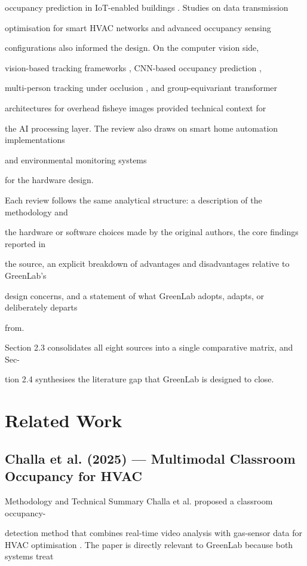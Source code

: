 occupancy prediction in IoT-enabled buildings \cite{khan2024}. Studies on data transmission

optimisation for smart HVAC networks \cite{alturjman2024} and advanced occupancy sensing

conﬁgurations \cite{tanaka2024} also informed the design. On the computer vision side,

vision-based tracking frameworks \cite{zhou2021}, CNN-based occupancy prediction \cite{meng2023},

multi-person tracking under occlusion \cite{kumar2024}, and group-equivariant transformer

architectures for overhead ﬁsheye images \cite{chen2023} provided technical context for

the AI processing layer. The review also draws on smart home automation implementations

\cite{marhoon2018,sowndarya2021} and environmental monitoring systems \cite{dhanashri2020}

for the hardware design.

Each review follows the same analytical structure: a description of the methodology and

the hardware or software choices made by the original authors, the core ﬁndings reported in

the source, an explicit breakdown of advantages and disadvantages relative to GreenLab's

design concerns, and a statement of what GreenLab adopts, adapts, or deliberately departs

from.

Section 2.3 consolidates all eight sources into a single comparative matrix, and Sec-

tion 2.4 synthesises the literature gap that GreenLab is designed to close.


\section{Related Work}

\subsection{Challa et al. (2025) --- Multimodal Classroom Occupancy for HVAC}
Methodology and Technical Summary Challa et al. proposed a classroom occupancy-

detection method that combines real-time video analysis with gas-sensor data for HVAC optimisation \cite{challa2025}. The paper is directly relevant to GreenLab because both systems treat

